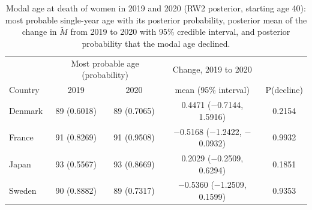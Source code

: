 \begin{table}[htb!]
\centering
\caption{Modal age at death of women in 2019 and 2020 (RW2 posterior, starting age 40): most probable single-year age with its posterior probability, posterior mean of the change in $\tilde{M}$ from 2019 to 2020 with 95\% credible interval, and posterior probability that the modal age declined.}
\label{tab:change}
\small
\begin{tabular}{lcccc}
\hline
 & \multicolumn{2}{c}{Most probable age (probability)} & Change, 2019 to 2020 & \\
Country & 2019 & 2020 & mean (95\% interval) & P(decline) \\
\hline
Denmark & 89 (0.6018) & 89 (0.7065) & 0.4471 ($-$0.7144, 1.5916) & 0.2154 \\
France & 91 (0.8269) & 91 (0.9508) & $-$0.5168 ($-$1.2422, $-$0.0932) & 0.9932 \\
Japan & 93 (0.5567) & 93 (0.8669) & 0.2029 ($-$0.2509, 0.6294) & 0.1851 \\
Sweden & 90 (0.8882) & 89 (0.7317) & $-$0.5360 ($-$1.2509, 0.1599) & 0.9353 \\
\hline
\end{tabular}
\end{table}
